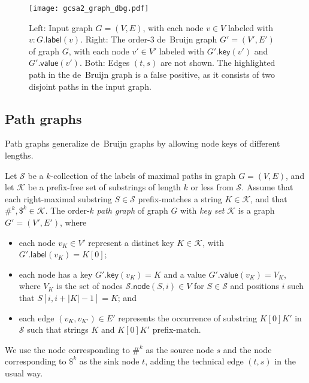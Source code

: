 \documentclass[a4paper,UKenglish]{lipics-v2016}
\newcommand{\abs}[1]{\ensuremath{\lvert #1 \rvert}}
\newcommand{\glabel}{\ensuremath{\mathsf{label}}}
\newcommand{\gkey}{\ensuremath{\mathsf{key}}}
\newcommand{\gvalue}{\ensuremath{\mathsf{value}}}
\newcommand{\gnode}{\ensuremath{\mathsf{node}}}
\newcommand{\kcollection}[1]{$#1$\nobreakdash-collection}
\newcommand{\orderk}[1]{order\nobreakdash-$#1$}
\begin{document}
\begin{figure}[t!]
\texttt{[image: gcsa2\_graph\_dbg.pdf]}
\caption{Left: Input graph $G = (V, E)$, with each node $v \in V$ labeled with $v:G.\glabel(v)$. Right: The \orderk{3} de~Bruijn graph $G' = (V', E')$ of graph $G$, with each node $v' \in V'$ labeled with $G'.\gkey(v')$ and $G'.\gvalue(v')$. Both: Edges $(t, s)$ are not shown. The highlighted path in the de~Bruijn graph is a false positive, as it consists of two disjoint paths in the input graph.}\label{figure:graph-dbg}
\end{figure}

\subsection{Path graphs}

Path graphs generalize de~Bruijn graphs by allowing node keys of different lengths.

\begin{definition}
Let $\mathcal{S}$ be a \kcollection{k} of the labels of maximal paths in graph $G = (V, E)$, and let $\mathcal{K}$ be a prefix-free set of substrings of length $k$ or less from $\mathcal{S}$. Assume that each right-maximal substring $S \in \mathcal{S}$ prefix-matches a string $K \in \mathcal{K}$, and that $\#^{k}, \$^{k} \in \mathcal{K}$. The \orderk{k} \emph{path graph} of graph $G$ with \emph{key set} $\mathcal{K}$ is a graph $G' = (V', E')$, where
\begin{itemize}
\item each node $v_{K} \in V'$ represent a distinct key $K \in \mathcal{K}$, with $G'.\glabel(v_{K}) = K[0]$;
\item each node has a key $G'.\gkey(v_{K}) = K$ and a value $G'.\gvalue(v_{K}) = V_{K}$, where $V_{K}$ is the set of nodes $\mathcal{S}.\gnode(S, i) \in V$ for $S \in \mathcal{S}$ and positions $i$ such that $S[i, i+\abs{K}-1] = K$; and
\item each edge $(v_{K}, v_{K'}) \in E'$ represents the occurrence of substring $K[0] K'$ in $\mathcal{S}$ such that strings $K$ and $K[0] K'$ prefix-match.
\end{itemize}
We use the node corresponding to $\#^{k}$ as the source node $s$ and the node corresponding to $\$^{k}$ as the sink node $t$, adding the technical edge $(t, s)$ in the usual way.
\end{definition}
\end{document}
